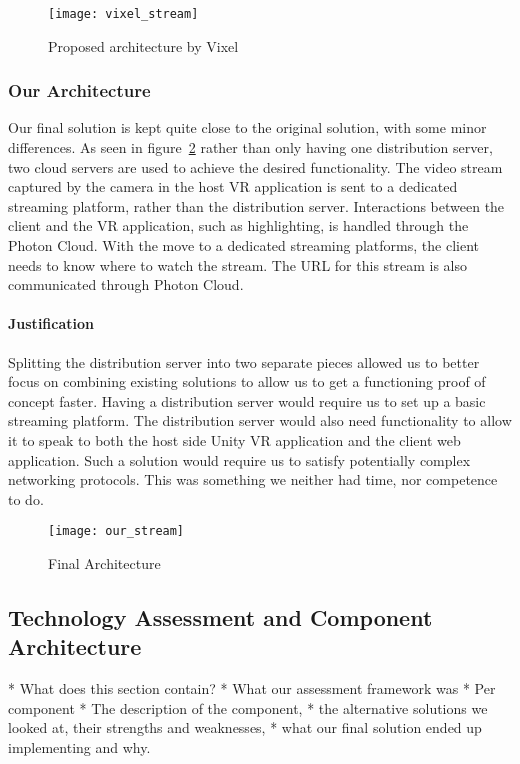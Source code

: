 \begin{figure}
    \texttt{[image: vixel\_stream]}
    \caption{Proposed architecture by Vixel}
    \label{fig:proposed_architecture}
\end{figure}

\subsubsection{Our Architecture}
Our final solution is kept quite close to the original solution, with some minor differences. As seen in figure~\ref{fig:our_architecture} rather than only having one distribution server, two cloud servers are used to achieve the desired functionality. The video stream captured by the camera in the host VR application is sent to a dedicated streaming platform, rather than the distribution server. Interactions between the client and the VR application, such as highlighting, is handled through the Photon Cloud. With the move to a dedicated streaming platforms, the client needs to know where to watch the stream. The URL for this stream is also communicated through Photon Cloud.

\paragraph{Justification}
Splitting the distribution server into two separate pieces allowed us to better focus on combining existing solutions to allow us to get a functioning proof of concept faster. Having a distribution server would require us to set up a basic streaming platform. The distribution server would also need functionality to allow it to speak to both the host side Unity VR application and the client web application. Such a solution would require us to satisfy potentially complex networking protocols. This was something we neither had time, nor competence to do.

\begin{figure}
    \texttt{[image: our\_stream]}
    \caption{Final Architecture}
    \label{fig:our_architecture}
\end{figure}

\subsection{Technology Assessment and Component Architecture}
* What does this section contain?
    * What our assessment framework was
    * Per component
        * The description of the component, 
        * the alternative solutions we looked at, their strengths and weaknesses, 
        * what our final solution ended up implementing and why.

